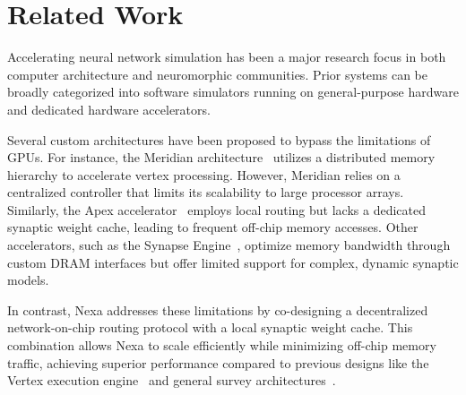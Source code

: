 \section{Related Work}
Accelerating neural network simulation has been a major research focus in both computer architecture and neuromorphic communities. Prior systems can be broadly categorized into software simulators running on general-purpose hardware and dedicated hardware accelerators.

Several custom architectures have been proposed to bypass the limitations of GPUs. For instance, the Meridian architecture~\cite{meridian2023} utilizes a distributed memory hierarchy to accelerate vertex processing. However, Meridian relies on a centralized controller that limits its scalability to large processor arrays. Similarly, the Apex accelerator~\cite{apex2021} employs local routing but lacks a dedicated synaptic weight cache, leading to frequent off-chip memory accesses. Other accelerators, such as the Synapse Engine~\cite{synapse2022}, optimize memory bandwidth through custom DRAM interfaces but offer limited support for complex, dynamic synaptic models.

In contrast, Nexa addresses these limitations by co-designing a decentralized network-on-chip routing protocol with a local synaptic weight cache. This combination allows Nexa to scale efficiently while minimizing off-chip memory traffic, achieving superior performance compared to previous designs like the Vertex execution engine~\cite{vertex2024} and general survey architectures~\cite{survey2020}.
